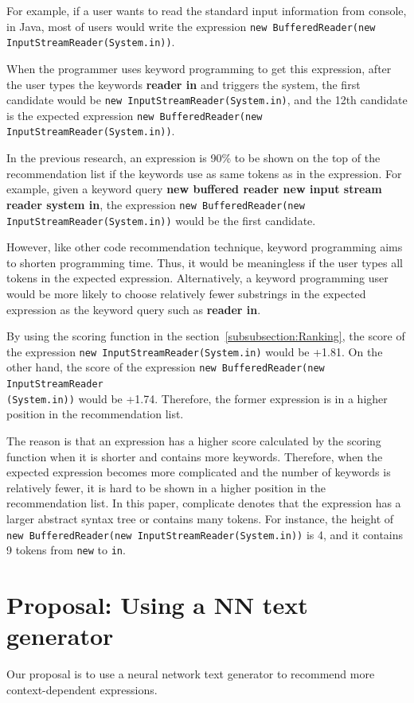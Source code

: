 \documentclass[PRO,english]{ipsj}
\begin{document}
For example, if a user wants to read the standard input information from console, in Java, most of users would write the expression \texttt{new BufferedReader(new InputStreamReader(System.in))}. 

When the programmer uses keyword programming to get this expression, after the user types the keywords \textbf{reader in} and triggers the system, the first candidate would be \texttt{new InputStreamReader(System.in)}, and the 12th candidate is the expected expression \texttt{new BufferedReader(new InputStreamReader(System.in))}. 



In the previous research, an expression is 90\% to be shown on the top of the recommendation list if the keywords use as same tokens as in the expression. For example, given a keyword query \textbf{new buffered reader new input stream reader system in}, the expression \texttt{new BufferedReader(new InputStreamReader(System.in))} would be the first candidate.

However, like other code recommendation technique, keyword programming aims to shorten programming time. Thus, it would be meaningless if the user types all tokens in the expected expression. Alternatively, a keyword programming user would be more likely to choose relatively fewer substrings in the expected expression as the keyword query such as \textbf{reader in}. 

By using the scoring function in the section~\ref{subsubsection:Ranking}, the score of the expression \texttt{new InputStreamReader(System.in)} would be +1.81. On the other hand, the score of the expression \texttt{new BufferedReader(new InputStreamReader}\\\texttt{(System.in))} would be +1.74. Therefore, the former expression is in a higher position in the recommendation list.

The reason is that an expression has a higher score calculated by the scoring function when it is shorter and contains more keywords. Therefore, when the expected expression becomes more complicated and the number of keywords is relatively fewer, it is hard to be shown in a higher position in the recommendation list. In this paper, complicate denotes that the expression has a larger abstract syntax tree or contains many tokens. For instance, the height of \texttt{new BufferedReader(new InputStreamReader(System.in))} is 4, and it contains 9 tokens from \texttt{new} to \texttt{in}.

\section{Proposal: Using a NN text generator}\label{sec:proposal}
Our proposal is to use a neural network text generator to recommend more context-dependent expressions.
\end{document}
